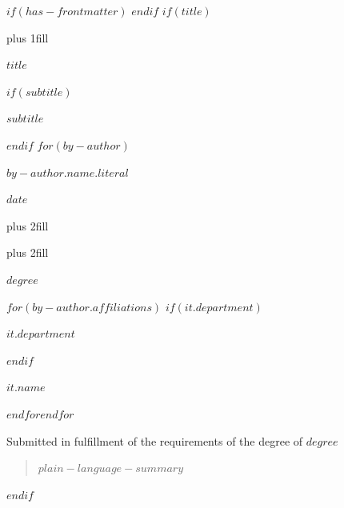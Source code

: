$if(has-frontmatter)$
\frontmatter
$endif$
$if(title)$
\cleardoublepage
\thispagestyle{empty}
{\centering
\hbox{}\vskip 0cm plus 1fill
{%
\Huge\bfseries $title$ \par}
$if(subtitle)$
\vspace{3ex}
{\Large\bfseries $subtitle$ \par}
$endif$
\vspace{6ex}
$for(by-author)$
{\Large\bfseries $by-author.name.literal$ \par}
\vspace{3ex}
{\bfseries\large $date$ \par}
\vskip 0cm plus 2fill
{ \par}
\vskip 0cm plus 2fill
{\bfseries\large $degree$ \par}
\vspace{3ex}
$for(by-author.affiliations)$%
$if(it.department)$%
{\bfseries\large $it.department$ \par}
\vspace{3ex}
$endif$%
{\bfseries\large $it.name$ \par}
$endfor$$endfor$%
\vspace{12ex}
{\small Submitted in fulfillment of the requirements
of the degree of $degree$ \par}
\pagebreak
\begin{quote}
\raggedright    
$plain-language-summary$
\end{quote}
}
$endif$